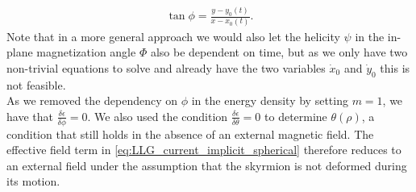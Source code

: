 \documentclass[12pt, a4paper]{article}		%
\numberwithin{equation}{section}
\begin{document}
\begin{align}
\tan\phi = \frac{y-y_0(t)}{x-x_0(t)}.
\end{align}
Note that in a more general approach we would also let the helicity $\psi$ in the in-plane magnetization angle $\Phi$ also be dependent on time, but as we only have two non-trivial equations to solve and already have the two variables $\dot{x}_0$ and $\dot{y}_0$ this is not feasible. \\
As we removed the dependency on $\phi$ in the energy density by setting $m=1$, we have that $\frac{\delta \epsilon}{\delta \phi} = 0$. We also used the condition $\frac{\delta\epsilon}{\delta\theta}=0$ to determine $\theta(\rho)$, a condition that still holds in the absence of an external magnetic field. The effective field term in \eqref{eq:LLG_current_implicit_spherical} therefore reduces to an external field under the assumption that the skyrmion is not deformed during its motion.
\end{document}
